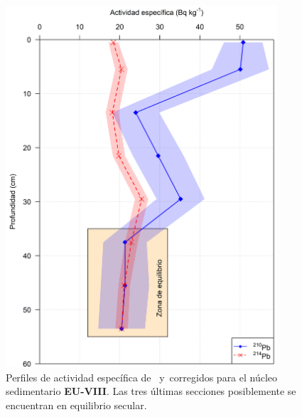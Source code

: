 \begin{figure}
\centering
\includegraphics[width=0.9\textwidth]{Imagenes/Act_210Pb_214Pb_EU_VIII.png}
\caption{Perfiles de actividad específica de \PbCero\, y \PbCuatro\,corregidos para el núcleo sedimentario \textbf{EU-VIII}. Las tres últimas secciones posiblemente se encuentran en equilibrio secular.}\label{Fig-EUVIII-Comp}
\end{figure}

